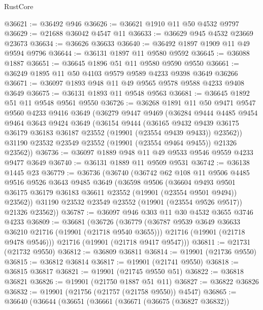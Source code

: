 \begin{lexlean}{RustCore}
\begin{coremodule}
@36621 := @36492 @946
@36626 := @36621 @1910 @11 @50 @4532 @9797
@36629 := @21688 @36042 @4547 @11
@36633 := @36629 @945 @4532 @23669 @23673
@36634 := @36626 @36633
@36640 := @36492 @1897 @1909 @11 @49 @9594 @9796
@36644 := @36131 @1897 @11 @9580 @9592
@36645 := @36088 @1887
@36651 := @36645 @1896 @51 @11 @9580 @9590 @9550
@36661 := @36249 @1895 @11 @50 @4103 @9579 @9589 @4233 @9398 @3649 @36266
@36671 := @36097 @1893 @948 @11 @49 @9565 @9578 @9588 @4233 @9408 @3649
@36675 := @36131 @1893 @11 @9548 @9563
@36681 := @36645 @1892 @51 @11 @9548 @9561 @9550
@36726 := @36268
    @1891
    @11
    @50
    @9471
    @9547
    @9560
    @4233
    @9416
    @3649
    (@36279
      @9447
      @9469
      (@36284
        @9444
        @4485
        @9454
        @9464
        @3643
        @9424
        @3649
        (@36154
          @9444
          (@36165
            @9432
            @9439
            @36175
            @36179
            @36183
            @36187
            @23552
            (@19901 (@23554 @9439 @9433))
            @23562))
        @31190
        @23532
        @23549
        @23552
        (@19901 (@23554 @9464 @9455))
        @21326
        @23562))
@36736 := @36097 @1889 @948 @11 @49 @9533 @9546 @9559 @4233 @9477 @3649
@36740 := @36131 @1889 @11 @9509 @9531
@36742 := @36138 @1445 @23
@36779 := @36736
    (@36740
      (@36742
        @62
        @108
        @11
        @9506
        @4485
        @9516
        @9526
        @3643
        @9485
        @3649
        (@36598
          @9506
          (@36604
            @9493
            @9501
            @36175
            @36179
            @36183
            @36611
            @23552
            (@19901 (@23554 @9501 @9494))
            @23562))
        @31190
        @23532
        @23549
        @23552
        (@19901 (@23554 @9526 @9517))
        @21326
        @23562))
@36787 := @36097 @946 @303 @11 @30 @4532 @3655 @3746 @4233
@36809 := @36681
    (@36726
      (@36779
        (@36787 @9539 @3649 @36633 @36210 @21716 (@19901 (@21718 @9540 @3655)))
        @21716
        (@19901 (@21718 @9478 @9546)))
      @21716
      (@19901 (@21718 @9417 @9547)))
@36811 := @21731 (@21732 @9550)
@36812 := @36809 @36811
@36814 := @19901 (@21736 @9550)
@36815 := @36812 @36814
@36817 := @19901 (@21741 @9550)
@36818 := @36815 @36817
@36821 := @19901 (@21745 @9550 @51)
@36822 := @36818 @36821
@36826 := @19901 (@21750 @1887 @51 @11)
@36827 := @36822 @36826
@36832 := @19901 (@21756 (@21757 (@21758 @9550)) @4547)
@36865 := @36640
    (@36644
      (@36651
        (@36661
          (@36671
            (@36675 (@36827 @36832))

\end{coremodule}
\end{lexlean}
